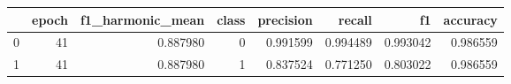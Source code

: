 \begin{tabular}{lrrrrrrr}
\toprule
 & epoch & f1_harmonic_mean & class & precision & recall & f1 & accuracy \\
\midrule
0 & 41 & 0.887980 & 0 & 0.991599 & 0.994489 & 0.993042 & 0.986559 \\
1 & 41 & 0.887980 & 1 & 0.837524 & 0.771250 & 0.803022 & 0.986559 \\
\bottomrule
\end{tabular}
